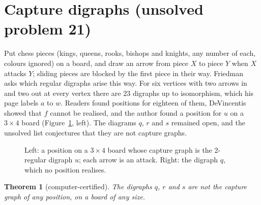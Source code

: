\documentclass[11pt]{amsart}
\newtheorem{theorem}{Theorem}
\theoremstyle{remark}
\begin{document}
\section{Capture digraphs (unsolved problem 21)}\label{sec:capture}

Put chess pieces (kings, queens, rooks, bishops and knights, any number of each, colours ignored) on
a board, and draw an arrow from piece $X$ to piece $Y$ when $X$ attacks $Y$; sliding pieces are
blocked by the first piece in their way. Friedman~\cite{capture} asks which regular digraphs arise
this way. For six vertices with two arrows in and two out at every vertex there are 23 digraphs up to
isomorphism, which his page labels $a$ to $w$. Readers found positions for eighteen of them,
DeVincentis showed that $f$ cannot be realised, and the author found a position for $u$ on a
$3\times4$ board (Figure~\ref{fig:capture}, left). The diagrams $q$, $r$ and $s$ remained open, and
the unsolved list conjectures that they are not capture graphs.

\begin{figure}[ht]
\centering
\qquad\qquad

\caption{Left: a position on a $3\times4$ board whose capture graph is the 2-regular digraph $u$;
each arrow is an attack. Right: the digraph $q$, which no position realises.}\label{fig:capture}
\end{figure}

\begin{theorem}[computer-certified]\label{thm:capture}
The digraphs $q$, $r$ and $s$ are not the capture graph of any position, on a board of any size.
\end{theorem}
\end{document}
